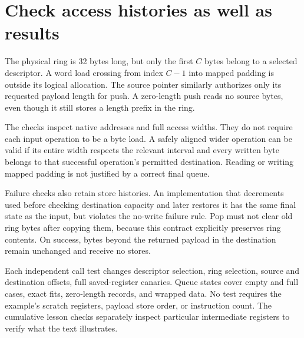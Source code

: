 \section{Check access histories as well as results}
The physical ring is 32 bytes long, but only the first \(C\) bytes belong to a
selected descriptor. A word load crossing from index \(C-1\) into mapped padding
is outside its logical allocation. The source pointer similarly authorizes only
its requested payload length for push. A zero-length push reads no source bytes,
even though it still stores a length prefix in the ring.

The checks inspect native addresses and full access widths. They do not require
each input operation to be a byte load. A safely aligned wider operation can be
valid if its entire width respects the relevant interval and every written byte
belongs to that successful operation's permitted destination. Reading or writing
mapped padding is not justified by a correct final queue.

Failure checks also retain store histories. An implementation that decrements
used before checking destination capacity and later restores it has the same final
state as the input, but violates the no-write failure rule. Pop must not clear old
ring bytes after copying them, because this contract explicitly preserves ring
contents. On success, bytes beyond the returned payload in the destination remain
unchanged and receive no stores.

Each independent call test changes descriptor selection, ring selection, source
and destination offsets, full saved-register
canaries. Queue states cover empty and full cases, exact fits, zero-length records,
and wrapped data. No test requires the example's scratch registers, payload store
order, or instruction count. The cumulative lesson checks separately inspect
particular intermediate registers to verify what the text illustrates.
